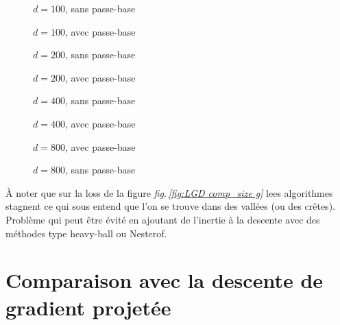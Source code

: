 \documentclass[hidelinks, french]{article} %
\newcommand{\figref}[1]{\textit{fig.\,\ref{#1}}}
\theoremstyle{enonce}
\theoremstyle{special}
\theoremstyle{rq}
\theoremstyle{exo}
\theoremstyle{demo}
\begin{document}
\begin{figure}[H]\centering
    
    \caption{$d=100$, sans passe-base}
    \label{fig:LGDlat100-s}
\end{figure}

\begin{figure}[H]\centering
	
	\caption{$d=100$, avec passe-base}
	\label{fig:LGDlat100-g}
\end{figure}

\begin{figure}[H]\centering
	
	\caption{$d=200$, sans passe-base}
	\label{fig:LGDlat200-s}
\end{figure}

\begin{figure}[H]\centering
	
	\caption{$d=200$, avec passe-base}
	\label{fig:LGDlat200-g}
\end{figure}

\begin{figure}[H]\centering
	
	\caption{$d=400$, sans passe-base}
	\label{fig:LGDlat400-s}
\end{figure}

\begin{figure}[H]\centering
	
	\caption{$d=400$, avec passe-base}
	\label{fig:LGDlat400-g}
\end{figure}

\begin{figure}[H]\centering
	
	\caption{$d=800$, avec passe-base}
	\label{fig:LGDlat800-s}
\end{figure}

\begin{figure}[H]\centering
	
	\caption{$d=800$, sans passe-base}
	\label{fig:LGDlat800-g}
\end{figure}
\`A noter que sur la loss de la figure \figref{fig:LGD comp_size g} lees algorithmes stagnent ce qui sous entend que l'on se trouve dans des vallées (ou des crêtes). Problème qui peut être évité en ajoutant de l'inertie à la descente avec des méthodes type heavy-ball ou Nesterof. 





\newpage



\section{Comparaison avec la descente de gradient projetée}\label{sec:comparPGD}
\end{document}
